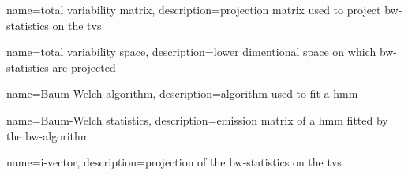 


{
    name=total variability matrix,
    description={projection matrix used to project \gls{bw-statistics}
        on the \gls{tvs}}
}

{
    name=total variability space,
    description={lower dimentional space on which \gls{bw-statistics}
        are projected}
}

{
    name=Baum-Welch algorithm,
    description={algorithm used to fit a \gls{hmm}}
}

{
    name=Baum-Welch statistics,
    description={emission matrix of a \gls{hmm} fitted by the
        \gls{bw-algorithm}}
}

{
    name=i-vector,
    description={projection of the \gls{bw-statistics} on the \gls{tvs}}
}
